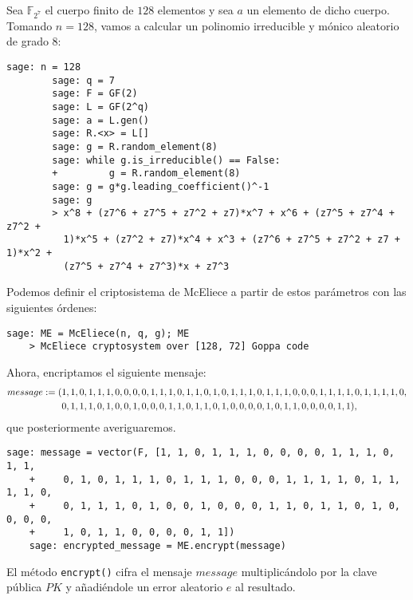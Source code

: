 \begin{exampleth}
    Sea $\mathbb{F}_{2^{7}}$ el cuerpo finito de $128$ elementos y sea $a$ un elemento de dicho cuerpo. Tomando $n = 128$, vamos a calcular un polinomio irreducible y mónico aleatorio de grado $8$:

    \begin{lstlisting}[gobble=4]
        sage: n = 128
        sage: q = 7
        sage: F = GF(2)
        sage: L = GF(2^q)
        sage: a = L.gen()
        sage: R.<x> = L[]
        sage: g = R.random_element(8)
        sage: while g.is_irreducible() == False:
        +         g = R.random_element(8)
        sage: g = g*g.leading_coefficient()^-1
        sage: g
        > x^8 + (z7^6 + z7^5 + z7^2 + z7)*x^7 + x^6 + (z7^5 + z7^4 + z7^2 +
          1)*x^5 + (z7^2 + z7)*x^4 + x^3 + (z7^6 + z7^5 + z7^2 + z7 + 1)*x^2 + 
          (z7^5 + z7^4 + z7^3)*x + z7^3
        \end{lstlisting}
    
    
    Podemos definir el criptosistema de McEliece a partir de estos parámetros con las siguientes órdenes:

    \begin{lstlisting}[gobble=4]
    sage: ME = McEliece(n, q, g); ME
    > McEliece cryptosystem over [128, 72] Goppa code
    \end{lstlisting}

    Ahora, encriptamos el siguiente mensaje:
    \begin{align}
        message := (&1, 1, 0, 1, 1, 1, 0, 0, 0, 0, 1, 1, 1, 0, 1, 1, 0, 1, 0, 1, 1, 1, 0, 1, 1, 1, 0, 0, 0, 1, 1, 1, 1, 0, 1, 1, 1, 1, 0, \notag\\
                    &0, 1, 1, 1, 0, 1, 0, 0, 1, 0, 0, 0, 1, 1, 0, 1, 1, 0, 1, 0, 0, 0, 0, 1, 0, 1, 1, 0, 0, 0, 0, 1, 1), \label{message}
    \end{align}
    que posteriormente averiguaremos.

    \begin{lstlisting}[gobble=4]
    sage: message = vector(F, [1, 1, 0, 1, 1, 1, 0, 0, 0, 0, 1, 1, 1, 0, 1, 1,
    +     0, 1, 0, 1, 1, 1, 0, 1, 1, 1, 0, 0, 0, 1, 1, 1, 1, 0, 1, 1, 1, 1, 0, 
    +     0, 1, 1, 1, 0, 1, 0, 0, 1, 0, 0, 0, 1, 1, 0, 1, 1, 0, 1, 0, 0, 0, 0, 
    +     1, 0, 1, 1, 0, 0, 0, 0, 1, 1])
    sage: encrypted_message = ME.encrypt(message)
    \end{lstlisting}

    El método \texttt{encrypt()} cifra el mensaje $message$ multiplicándolo por la clave pública $PK$ y añadiéndole un error aleatorio $e$ al resultado.


\end{exampleth}

